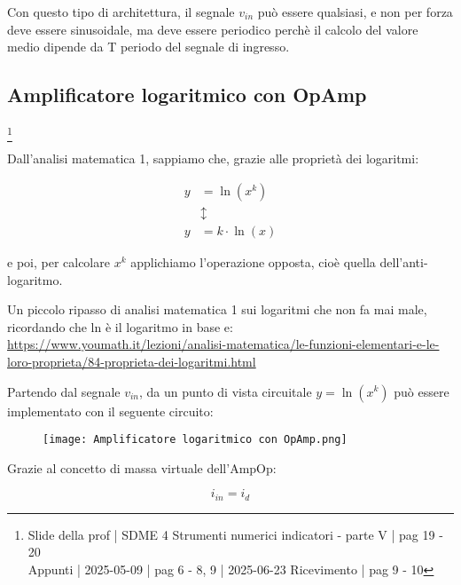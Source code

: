 Con questo tipo di architettura, il segnale $v_{in}$ può essere qualsiasi, e non per forza deve essere sinusoidale, ma deve essere periodico perchè il calcolo del valore medio dipende da T periodo del segnale di ingresso. \newline 

\newpage 

\subsection{Amplificatore logaritmico con OpAmp}
\footnote{Slide della prof | SDME 4 Strumenti numerici indicatori - parte V | pag 19 - 20\\  
Appunti | 2025-05-09 | pag 6 - 8, 9 | 2025-06-23 Ricevimento | pag 9 - 10}

Dall'analisi matematica 1, sappiamo che, grazie alle proprietà dei logaritmi: 

{
    \Large 
    \begin{equation}
        \begin{split}
            y &= \ln(x^{k})
            \\
            &\updownarrow
            \\ 
            y &= k \cdot \ln(x)
        \end{split}
    \end{equation}
}

e poi, per calcolare $x^{k}$ applichiamo l'operazione opposta, cioè quella dell'anti-logaritmo. \newline 

\begin{tcolorbox}
    Un piccolo ripasso di analisi matematica 1 sui logaritmi che non fa mai male, ricordando che ln è il logaritmo in base e: \\
    \url{https://www.youmath.it/lezioni/analisi-matematica/le-funzioni-elementari-e-le-loro-proprieta/84-proprieta-dei-logaritmi.html}   
\end{tcolorbox}

Partendo dal segnale $v_{in}$, da un punto di vista circuitale $y = \ln (x^{k})$  
può essere implementato con il seguente circuito: 

\begin{figure}[h]
    \centering
    \texttt{[image: Amplificatore logaritmico con OpAmp.png]}
\end{figure}

Grazie al concetto di massa virtuale dell'AmpOp: 

{
    \Large 
    \begin{equation}
        i_{in} = i_d
    \end{equation}
}

